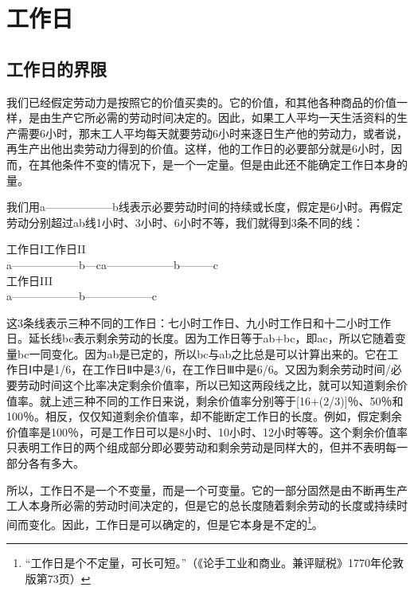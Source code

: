 \documentclass{ctexbook}
\begin{document}
\chapter{工作日}

    \section{工作日的界限}

    我们已经假定劳动力是按照它的价值买卖的。它的价值，和其他各种商品的价值一样，是由生产它所必需的劳动时间决定的。因此，如果工人平均一天生活资料的生产需要6小时，那末工人平均每天就要劳动6小时来逐日生产他的劳动力，或者说，再生产出他出卖劳动力得到的价值。这样，他的工作日的必要部分就是6小时，因而，在其他条件不变的情况下，是一个一定量。但是由此还不能确定工作日本身的量。

    我们用a——————b线表示必要劳动时间的持续或长度，假定是6小时。再假定劳动分别超过ab线1小时、3小时、6小时不等，我们就得到3条不同的线：

    \begin{center}
        工作日I\hspace{5cm}工作日II\\
        a——————b—c\hspace{3cm}a——————b———c\\
        工作日III\\
        a——————b——————c\\
    \end{center}
    
    这3条线表示三种不同的工作日：七小时工作日、九小时工作日和十二小时工作日。延长线bc表示剩余劳动的长度。因为工作日等于ab+bc，即ac，所以它随着变量bc一同变化。因为ab是已定的，所以bc与ab之比总是可以计算出来的。它在工作日Ⅰ中是1/6，在工作日Ⅱ中是3/6，在工作日Ⅲ中是6/6。又因为剩余劳动时间/必要劳动时间这个比率决定剩余价值率，所以已知这两段线之比，就可以知道剩余价值率。就上述三种不同的工作日来说，剩余价值率分别等于[16+(2/3)]％、50％和100％。相反，仅仅知道剩余价值率，却不能断定工作日的长度。例如，假定剩余价值率是100％，可是工作日可以是8小时、10小时、12小时等等。这个剩余价值率只表明工作日的两个组成部分即必要劳动和剩余劳动是同样大的，但并不表明每一部分各有多大。

    所以，工作日不是一个不变量，而是一个可变量。它的一部分固然是由不断再生产工人本身所必需的劳动时间决定的，但是它的总长度随着剩余劳动的长度或持续时间而变化。因此，工作日是可以确定的，但是它本身是不定的\footnote{“工作日是个不定量，可长可短。”（《论手工业和商业。兼评赋税》1770年伦敦版第73页）}。
\end{document}
